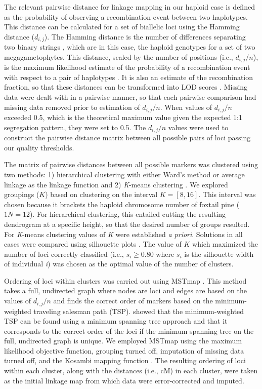 \documentclass[11pt]{article}
\begin{document}
The relevant pairwise distance for linkage mapping in our haploid case is defined as the probability 
of observing a recombination event between two haplotypes. This distance can be calculated for a set of 
biallelic loci using the Hamming distance ($d_{i,j}$).
The Hamming distance is the number of differences separating two binary strings \citep{Hamming:1950}, which are 
in this case, the haploid genotypes for a set of two megagametophytes. 
This distance, scaled by the number of positions (i.e., $d_{i,j}/n$), 
is the maximum likelihood estimate of the probability of a recombination event with respect to a pair of haplotypes 
\citep{Wu:2008a}. It is also an estimate of the recombination fraction, so that these distances can be transformed into LOD 
scores \citep[see][]{Morton:1955}. Missing data were dealt with in a pairwise manner, so that each pairwise comparison had 
missing data removed prior to estimation of $d_{i,j}/n$. When values of $d_{i,j}/n$ exceeded 0.5, which is the theoretical maximum 
value given the expected 1:1 segregation pattern, they were set to 0.5.  The $d_{i,j}/n$ values were used to construct the 
pairwise distance matrix between all possible pairs of loci passing our quality thresholds.

The matrix of pairwise distances between all possible markers was clustered using two methods: 1) hierarchical clustering with 
either Ward's method \citep{Ward:1963} or average linkage \citep{Sokal:1958} as the linkage function and 2) \textit{K}-means 
clustering \citep{Hartigan:1979}. We explored groupings ($K$) based on clustering on the interval $K=[8,16]$. This interval was 
chosen because it brackets the haploid chromosome number of foxtail pine ($1N = 12$). For hierarchical clustering, this entailed 
cutting the resulting dendrogram at a specific height, so that the desired number of groups resulted. For \textit{K}-means clustering 
values of \textit{K} were established \textit{a priori}. Solutions in all cases were compared using silhouette plots \citep{Rousseeuw:1987}. 
The value of $K$ which maximized the number of loci correctly classified  (i.e., $s_{i} \geq 0.80$ where $s_{i}$ is the silhouette width 
of individual \textit{i}) was chosen as the optimal value of the number of clusters.

Ordering of loci within clusters was carried out using MSTmap \citep{Wu:2008a}. This method takes a full, undirected graph where 
nodes are loci and edges are based on the values of $d_{i,j}/n$ and finds the correct order of markers based on the minimum-weighted 
traveling salesman path (TSP). \citet{Wu:2008a} showed that the minimum-weighted TSP can be found using a minimum spanning tree approach 
and that it corresponds to the correct order of the loci if the minimum spanning tree on the full, undirected graph is unique. We 
employed MSTmap using the maximum likelihood objective function, grouping turned off, imputation of missing data turned off, and the 
Kosambi mapping function \citep{Kosambi:1944}. The resulting ordering of loci within each cluster, along with the distances (i.e., cM) 
in each cluster, were taken as the initial linkage map from which data were error-corrected and imputed.
 
\end{document}
